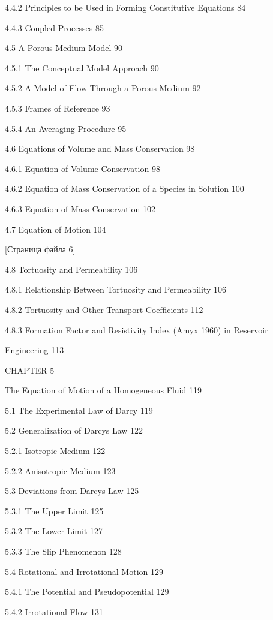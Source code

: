 \documentclass[
  11pt,
]{article}
\begin{document}
4.4.2 Principles to be Used in Forming Constitutive Equations 84 \par
4.4.3 Coupled Processes 85 \par
4.5 A Porous Medium Model 90 \par
4.5.1 The Conceptual Model Approach 90 \par
4.5.2 A Model of Flow Through a Porous Medium 92 \par
4.5.3 Frames of Reference 93 \par
4.5.4 An Averaging Procedure 95 \par
4.6 Equations of Volume and Mass Conservation 98 \par
4.6.1 Equation of Volume Conservation 98 \par
4.6.2 Equation of Mass Conservation of a Species in Solution 100 \par
4.6.3 Equation of Mass Conservation 102 \par
4.7 Equation of Motion 104 \par
\smallskip
\smallskip
\smallskip
{[}Страница файла 6{]}\par
4.8 Tortuosity and Permeability 106 \par
4.8.1 Relationship Between Tortuosity and Permeability 106 \par
4.8.2 Tortuosity and Other Transport Coefficients 112 \par
4.8.3 Formation Factor and Resistivity Index (Amyx 1960) in Reservoir \par
Engineering 113 \par
CHAPTER 5 \par
The Equation of Motion of a Homogeneous Fluid 119 \par
5.1 The Experimental Law of Darcy 119 \par
5.2 Generalization of Darcy\textquotesingle s Law 122 \par
5.2.1 Isotropic Medium 122 \par
5.2.2 Anisotropic Medium 123 \par
5.3 Deviations from Darcy\textquotesingle s Law 125 \par
5.3.1 The Upper Limit 125 \par
5.3.2 The Lower Limit 127 \par
5.3.3 The Slip Phenomenon 128 \par
5.4 Rotational and Irrotational Motion 129 \par
5.4.1 The Potential and Pseudopotential 129 \par
5.4.2 Irrotational Flow 131 \par
\end{document}
